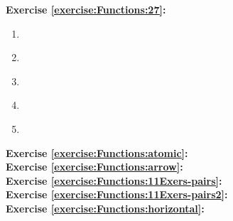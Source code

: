 \noindent\textbf{Exercise \ref{exercise:Functions:27}:}\\ %
\begin{multicols}{2}
\begin{enumerate}
\item \label{FunctionsChapExers-FindAll-abc,d}
\item \label{FunctionsChapExers-FindAll-ab,cd}
\item \label{FunctionsChapExers-FindAll-a,bcd}
\item \label{FunctionsChapExers-FindAll-ab,cde}
\item 
\end{enumerate}
\end{multicols}


\noindent\textbf{Exercise \ref{exercise:Functions:atomic}:}\\

\noindent\textbf{Exercise \ref{exercise:Functions:arrow}:}\\

\noindent\textbf{Exercise \ref{exercise:Functions:11Exers-pairs}:}\\

\noindent\textbf{Exercise \ref{exercise:Functions:11Exers-pairs2}:}\\


\noindent\textbf{Exercise \ref{exercise:Functions:horizontal}:}\\


